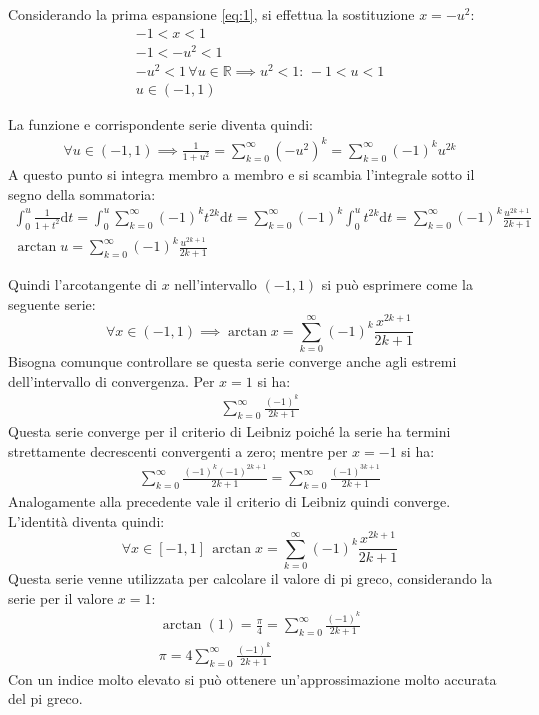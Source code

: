 \documentclass{article}
\numberwithin{equation}{subsection}
\begin{document}
Considerando la prima espansione \ref{eq:1}, si effettua la sostituzione $x=-u^2$: 
\begin{gather*}
    -1<x<1\\
    -1<-u^2<1\\
    -u^2<1\,\forall u\in\mathbb{R}\implies u^2<1:\,-1<u<1\\
    u\in(-1,1)
\end{gather*}

La funzione e corrispondente serie diventa quindi:
\begin{gather*}
    \forall u\in(-1,1)\implies\displaystyle\frac{1}{1+u^2}=\sum_{k=0}^\infty(-u^2)^k=
    \sum_{k=0}^\infty(-1)^ku^{2k}
\end{gather*}
A questo punto si integra membro a membro e si scambia l'integrale sotto il segno della sommatoria:
\begin{gather*}
    \displaystyle\int_0^u\frac{1}{1+t^2}\mathrm{d}t=
    \int_0^u\sum_{k=0}^\infty(-1)^kt^{2k}\mathrm{d}t=
    \sum_{k=0}^\infty(-1)^k\int_0^ut^{2k}\mathrm{d}t=
    \sum_{k=0}^\infty(-1)^k\frac{u^{2k+1}}{2k+1}\\
    \arctan u=\sum_{k=0}^\infty(-1)^k\frac{u^{2k+1}}{2k+1}
\end{gather*}

Quindi l'arcotangente di $x$ nell'intervallo $(-1,1)$ si può esprimere come la seguente serie:
\begin{equation}
    \forall x\in(-1,1)\implies\arctan x=\sum_{k=0}^\infty(-1)^k\frac{x^{2k+1}}{2k+1}
\end{equation}
Bisogna comunque controllare se questa serie converge anche agli estremi dell'intervallo di convergenza. Per $x=1$ si ha:
\begin{gather*}
    \displaystyle\sum_{k=0}^{\infty}\frac{(-1)^k}{2k+1}
\end{gather*}
Questa serie converge per il criterio di Leibniz poiché la serie ha termini strettamente decrescenti convergenti a zero; mentre per $x=-1$ si ha:
\begin{gather*}
    \displaystyle\sum_{k=0}^{\infty}\frac{(-1)^k(-1)^{2k+1}}{2k+1}=
    \displaystyle\sum_{k=0}^{\infty}\frac{(-1)^{3k+1}}{2k+1}
\end{gather*}
Analogamente alla precedente vale il criterio di Leibniz quindi converge. L'identità diventa quindi:
\begin{equation}
    \forall x\in[-1,1]\,\arctan x=\displaystyle\sum_{k=0}^\infty(-1)^k\frac{x^{2k+1}}{2k+1}
\end{equation}
Questa serie venne utilizzata per calcolare il valore di pi greco, considerando la serie per il valore $x=1$:
\begin{gather*}
    \arctan(1)=\displaystyle\frac{\pi}{4}=\displaystyle\sum_{k=0}^\infty\frac{(-1)^k}{2k+1}\\
    \pi=4\displaystyle\sum_{k=0}^\infty\frac{(-1)^k}{2k+1}
\end{gather*}
Con un indice molto elevato si può ottenere un'approssimazione molto accurata del pi greco. 
\end{document}
